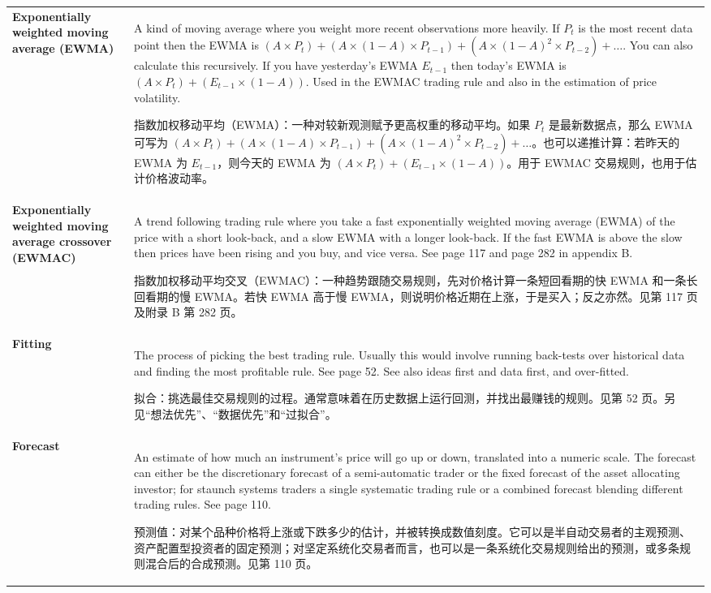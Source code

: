 \begin{chinesetableblock}
{\begin{longtable}{@{}>{\raggedright\arraybackslash\bfseries} p{}>{\raggedright\arraybackslash} p{}@{}}
Exponentially weighted moving average (EWMA) & A kind of moving average where you weight more recent observations more heavily. If \(P_t\) is the most recent data point then the EWMA is \((A \times P_t) + (A \times (1 - A) \times P_{t-1}) + (A \times (1 - A)^2 \times P_{t-2}) + \dots\). You can also calculate this recursively. If you have yesterday’s EWMA \(E_{t-1}\) then today’s EWMA is \((A \times P_t) + (E_{t-1} \times (1 - A))\). Used in the EWMAC trading rule and also in the estimation of price volatility. \par 指数加权移动平均（EWMA）：一种对较新观测赋予更高权重的移动平均。如果 \(P_t\) 是最新数据点，那么 EWMA 可写为 \((A \times P_t) + (A \times (1 - A) \times P_{t-1}) + (A \times (1 - A)^2 \times P_{t-2}) + \dots\)。也可以递推计算：若昨天的 EWMA 为 \(E_{t-1}\)，则今天的 EWMA 为 \((A \times P_t) + (E_{t-1} \times (1 - A))\)。用于 EWMAC 交易规则，也用于估计价格波动率。 \\[0.65em]
Exponentially weighted moving average crossover (EWMAC) & A trend following trading rule where you take a fast exponentially weighted moving average (EWMA) of the price with a short look-back, and a slow EWMA with a longer look-back. If the fast EWMA is above the slow then prices have been rising and you buy, and vice versa. See page 117 and page 282 in appendix B. \par 指数加权移动平均交叉（EWMAC）：一种趋势跟随交易规则，先对价格计算一条短回看期的快 EWMA 和一条长回看期的慢 EWMA。若快 EWMA 高于慢 EWMA，则说明价格近期在上涨，于是买入；反之亦然。见第 117 页及附录 B 第 282 页。 \\[0.65em]
Fitting & The process of picking the best trading rule. Usually this would involve running back-tests over historical data and finding the most profitable rule. See page 52. See also ideas first and data first, and over-fitted. \par 拟合：挑选最佳交易规则的过程。通常意味着在历史数据上运行回测，并找出最赚钱的规则。见第 52 页。另见“想法优先”、“数据优先”和“过拟合”。 \\[0.65em]
Forecast & An estimate of how much an instrument’s price will go up or down, translated into a numeric scale. The forecast can either be the discretionary forecast of a semi-automatic trader or the fixed forecast of the asset allocating investor; for staunch systems traders a single systematic trading rule or a combined forecast blending different trading rules. See page 110. \par 预测值：对某个品种价格将上涨或下跌多少的估计，并被转换成数值刻度。它可以是半自动交易者的主观预测、资产配置型投资者的固定预测；对坚定系统化交易者而言，也可以是一条系统化交易规则给出的预测，或多条规则混合后的合成预测。见第 110 页。 \\[0.65em]

\end{longtable}}
\end{chinesetableblock}
